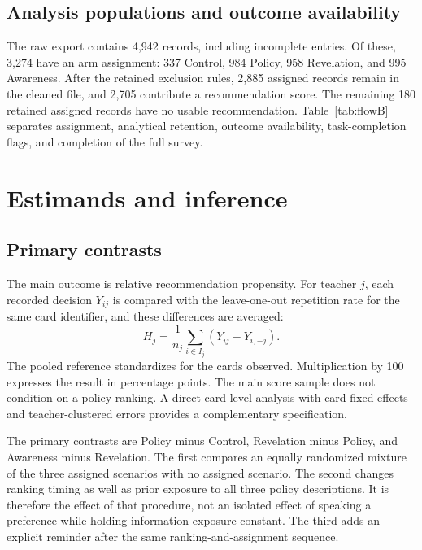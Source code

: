 \subsection{Analysis populations and outcome availability}
The raw export contains 4,942 records, including incomplete entries. Of these, 3,274 have an arm assignment: 337 Control, 984 Policy, 958 Revelation, and 995 Awareness. After the retained exclusion rules, 2,885 assigned records remain in the cleaned file, and 2,705 contribute a recommendation score. The remaining 180 retained assigned records have no usable recommendation. Table~\ref{tab:flowB} separates assignment, analytical retention, outcome availability, task-completion flags, and completion of the full survey.

\section{Estimands and inference}
\subsection{Primary contrasts}
The main outcome is relative recommendation propensity. For teacher $j$, each recorded decision $Y_{ij}$ is compared with the leave-one-out repetition rate for the same card identifier, and these differences are averaged:
\[
 H_j=\frac{1}{n_j}\sum_{i\in I_j}(Y_{ij}-\bar Y_{i,-j}).
\]
The pooled reference standardizes for the cards observed. Multiplication by 100 expresses the result in percentage points. The main score sample does not condition on a policy ranking. A direct card-level analysis with card fixed effects and teacher-clustered errors provides a complementary specification.

The primary contrasts are Policy minus Control, Revelation minus Policy, and Awareness minus Revelation. The first compares an equally randomized mixture of the three assigned scenarios with no assigned scenario. The second changes ranking timing as well as prior exposure to all three policy descriptions. It is therefore the effect of that procedure, not an isolated effect of speaking a preference while holding information exposure constant. The third adds an explicit reminder after the same ranking-and-assignment sequence.

